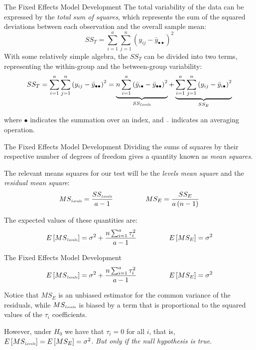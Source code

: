 %
\begin{frame}
{The Fixed Effects Model}
{Development}
The total variability of the data can be expressed by the \textit{total sum of squares}, which represents the sum of the squared deviations between each observation and the overall sample mean:
\begin{equation*}
SS_T = \sum_{i=1}^{a}{\sum_{j=1}^{n}{\left(y_{ij} - \bar{y}_{\bullet\bullet}\right)^2}}
\end{equation*}
With some relatively simple algebra, the $SS_T$ can be divided into two terms, representing the within-group and the between-group variability:
\begin{equation*}
SS_T = \sum_{i=1}^{a}{\sum_{j=1}^{n}{\left(y_{ij} - \bar{y}_{\bullet\bullet}\right)^2}}=\underbrace{n\sum_{i=1}^{a}{\left(\bar{y}_{i\bullet} - \bar{y}_{\bullet\bullet}\right)^2}}_{SS_{\mbox{\tiny\textit{Levels}}}} + \underbrace{\sum_{i=1}^{a}{\sum_{j=1}^{n}{\left(y_{ij}- \bar{y}_{i\bullet}\right)^2}}}_{SS_E}
\end{equation*}

\noindent where $\bullet$ indicates the summation over an index, and $\bar{\ \ }$ indicates an averaging operation.
\end{frame}
%
%
\begin{frame}
{The Fixed Effects Model}
{Development}
Dividing the sums of squares by their respective number of degrees of freedom gives a quantity known as \textit{mean squares}.
\bigskip

The relevant means squares for our test will be the \textit{levels mean square} and the \textit{residual mean square}:
\begin{equation*}
MS_{\mbox{\tiny\textit{Levels}}} = \frac{SS_{\mbox{\tiny\textit{Levels}}}}{a-1}
\ \ \ \ \ \ \ \ \ \ \ \ \ \
MS_E = \frac{SS_E}{a\left(n-1\right)}
\end{equation*}

The expected values of these quantities are:
\begin{equation*}
E\left[MS_{\mbox{\tiny\textit{Levels}}}\right] = \sigma^2 + \frac{n\sum_{i=1}^{a}{\tau_i^2}}{a-1}
\ \ \ \ \ \ \ \ \ \ \ \ \ \
E\left[MS_E\right] = \sigma^2
\end{equation*}

\end{frame}
%
%
\begin{frame}
{The Fixed Effects Model}
{Development}
\begin{equation*}
E\left[MS_{\mbox{\tiny\textit{Levels}}}\right] = \sigma^2 + \frac{n\sum_{i=1}^{a}{\tau_i^2}}{a-1}
\ \ \ \ \ \ \ \ \ \ \ \ \ \
E\left[MS_E\right] = \sigma^2
\end{equation*}

Notice that $MS_E$ is an unbiased estimator for the common variance of the residuals, while $MS_{\mbox{\tiny\textit{Levels}}}$ is biased by a term that is proportional to the squared values of the $\tau_i$ coefficients.
\bigskip

However, under $H_0$ we have that $\tau_i=0$ for all $i$, that is, $E\left[MS_{\mbox{\tiny\textit{Levels}}}\right] = E\left[MS_{E}\right] = \sigma^2$. \alert{\textit{But only if the null hypothesis is true}}.
\end{frame}

